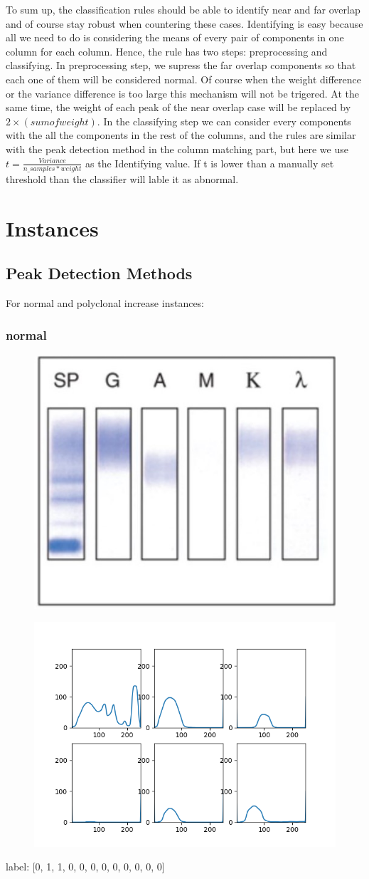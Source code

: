 \documentclass[12pt]{ctexart}
\begin{document}
\par To sum up, the classification rules should be able to identify near and far overlap and of course stay robust when countering these cases. Identifying is easy because all we need to do is considering the means of every pair of components in one column for each column. Hence, the rule has two steps: preprocessing and classifying. In preprocessing step, we supress the far overlap components so that each one of them will be considered normal. Of course when the weight difference or the variance difference is too large this mechanism will not be trigered. At the same time, the weight of each peak of the near overlap case will be replaced by $2\times(sum of weight)$. In the classifying step we can consider every components with the all the components in the rest of the columns, and the rules are similar with the peak detection method in the column matching part, but here we use $t=\frac{Variance}{n\_samples*weight}$ as the Identifying value. If t is lower than a manually set threshold than the classifier will lable it as abnormal.
\section{Instances}
\subsection{Peak Detection Methods}
For normal and polyclonal increase instances:
\subsubsection{normal}
\begin{figure}[H]
    \centering
    \includegraphics[width=0.5\linewidth]{no.jpg}
\end{figure}
\begin{figure}[H]
    \centering
    \includegraphics[width=0.5\linewidth]{normal.png}
\end{figure}
label: [0, 1, 1, 0, 0, 0, 0, 0, 0, 0, 0, 0]
\end{document}
